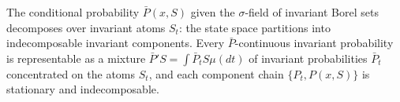 The conditional probability $\bar{P}(x, S)$ given the $\sigma$-field of invariant Borel sets decomposes over invariant atoms $S_t$: the state space partitions into indecomposable invariant components. Every $\bar{P}$-continuous invariant probability is representable as a mixture $\bar{P}'S = \int \bar{P}_t S \mu(dt)$ of invariant probabilities $\bar{P}_t$ concentrated on the atoms $S_t$, and each component chain $\{P_t, P(x, S)\}$ is stationary and indecomposable.
